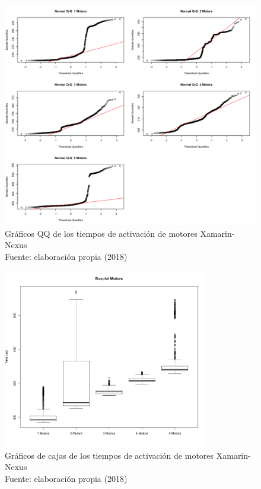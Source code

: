 \begin{figure}[H]
  \begin{center} 
   	\includegraphics[width=1.0\textwidth]{evaluation/graphics/Xamarin/Nexus/NormalQQMotorsXamarinNexus.png} 
   	\captionsetup{justification=centering}
    \caption[Gráfico QQ de los tiempos de activación de motores Xamarin-Nexus]{Gráficos QQ de los tiempos de activación de motores Xamarin-Nexus\\Fuente: elaboración propia (2018)} 
    \label{fig:xamarin-nexus-QQ-motors}
  \end{center}
\end{figure}

\begin{figure}[H]
  \begin{center} 
   	\includegraphics[width=0.8\textwidth]{evaluation/graphics/Xamarin/Nexus/BoxplotMotorsXamarinNexus.png} 
   	\captionsetup{justification=centering}
    \caption[Gráficos de cajas de los tiempos de activación de motores Xamarin-Nexus]{Gráficos de cajas de los tiempos de activación de motores Xamarin-Nexus\\Fuente: elaboración propia (2018)} 
    \label{fig:xamarin-nexus-boxplot-motors}
  \end{center}
\end{figure}


